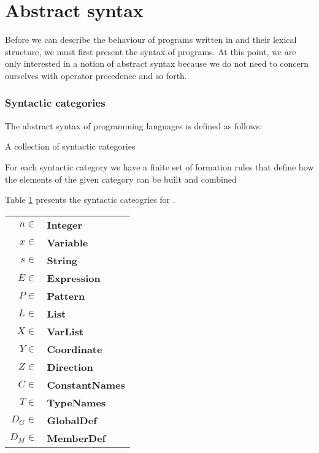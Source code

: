 \section{Abstract syntax}
\label{sec:abstractsyntax}
Before we can describe the behaviour of programs written in \productname{} and
their lexical structure, we must first present the syntax of programs. At this
point, we are only interested in a notion of abstract syntax because we do not
need to concern ourselves with operator precedence and so forth.

\subsubsection{Syntactic categories}
The abstract syntax of programming languages is defined as follows\cite[p.
27]{tt-hh}:

\begin{dlist}
  \item A collection of syntactic categories
  \item For each syntactic category we have a finite set of formation rules
    that define how the elements of the given category can be built and combined
\end{dlist}

Table \ref{table:syn-cat} presents the syntactic cateogries for \productname{}.

\begin{table}[ht]
  \begin{center}
    \begin{tabular}{rl}
      \hline
      $n \in$ & \textbf{Integer}         \\
      $x \in$ & \textbf{Variable}        \\
      $s \in$ & \textbf{String}          \\
      $E \in$ & \textbf{Expression}      \\
      $P \in$ & \textbf{Pattern}         \\
      $L \in$ & \textbf{List}            \\
      $X \in$ & \textbf{VarList}         \\
      $Y \in$ & \textbf{Coordinate}      \\
      $Z \in$ & \textbf{Direction}       \\
      $C \in$ & \textbf{ConstantNames}   \\
      $T \in$ & \textbf{TypeNames}       \\
      $D_{G} \in$ & \textbf{GlobalDef}   \\
      $D_{M} \in$ & \textbf{MemberDef}   \\
      \hline
    \end{tabular}  
    \label{table:syn-cat}
  \end{center}
\end{table}

